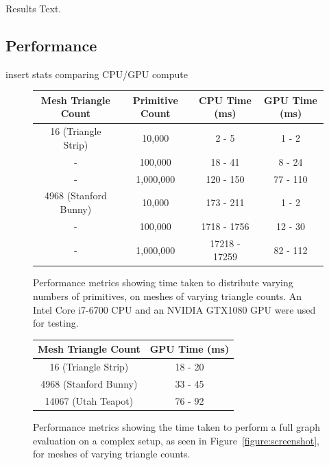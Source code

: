 \documentclass[]{acmsiggraph}
\begin{document}
Results Text.

\subsection{Performance} \label{sec:performance}

insert stats comparing CPU/GPU compute

\begin{figure}[htbp]\centering
\begin{center}
\begin{tabular}{||c||c|c|c||}
\hline
Mesh Triangle Count & Primitive Count & CPU Time (ms) & GPU Time (ms)\\
\hline
\hline
16 (Triangle Strip) & 10,000 & 2 - 5 & 1 - 2\\
\hline
 - & 100,000 & 18 - 41 & 8 - 24\\
\hline
 - & 1,000,000 & 120 - 150 & 77 - 110\\
\hline
4968 (Stanford Bunny) & 10,000 & 173 - 211 & 1 - 2\\
\hline
 - & 100,000 & 1718 - 1756 & 12 - 30\\
\hline
 - & 1,000,000 & 17218 - 17259 & 82 - 112\\
\hline
\end{tabular}
\caption{\label{figure:distributionPerformance} Performance metrics showing time taken to distribute varying numbers of primitives, on meshes of varying triangle counts. An Intel Core i7-6700 CPU and an NVIDIA GTX1080 GPU were used for testing.}
\end{center}
\end{figure}

\begin{figure}[htbp]\centering
\begin{center}
\begin{tabular}{||c|c||}
\hline
Mesh Triangle Count & GPU Time (ms)\\
\hline
\hline
16 (Triangle Strip) & 18 - 20\\
\hline
4968 (Stanford Bunny) & 33 - 45\\
\hline
14067 (Utah Teapot) & 76 - 92\\
\hline
\end{tabular}
\caption{\label{figure:fullPerformance} Performance metrics showing the time taken to perform a full graph evaluation on a complex setup, as seen in Figure~\ref{figure:screenshot}, for meshes of varying triangle counts.}
\end{center}
\end{figure}
\end{document}
